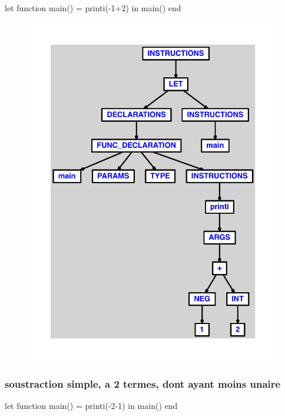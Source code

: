 \documentclass{article}
\begin{document}
\begin{verbatimtab}
let
	function main() = printi(-1+2)
in main() end
\end{verbatimtab}
\begin{figure}[H]\centering\includegraphics[max width=\textwidth]{ast/ast_63.pdf}\end{figure}\subsubsection{soustraction simple, a 2 termes, dont ayant moins unaire}
\begin{verbatimtab}
let
	function main() = printi(-2-1)
in main() end
\end{verbatimtab}
\end{document}
